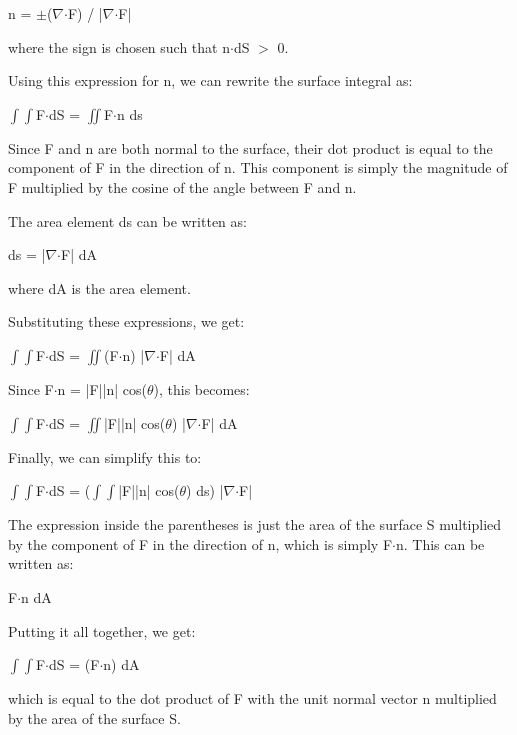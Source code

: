 \documentclass{article}
\begin{document}
n = \ensuremath{\pm}(\ensuremath{\nabla}\ensuremath{\cdot}F) / |\ensuremath{\nabla}\ensuremath{\cdot}F|

where the sign is chosen such that n\ensuremath{\cdot}dS \ensuremath{>} 0.

Using this expression for n, we can rewrite the surface integral as:

\ensuremath{\int}\ensuremath{\int}F\ensuremath{\cdot}dS = \ensuremath{\iint}F\ensuremath{\cdot}n ds

Since F and n are both normal to the surface, their dot product is equal to the component of F in the direction of n. This component is simply the magnitude of F multiplied by the cosine of the angle between F and n.

The area element ds can be written as:

ds = |\ensuremath{\nabla}\ensuremath{\cdot}F| dA

where dA is the area element.

Substituting these expressions, we get:

\ensuremath{\int}\ensuremath{\int}F\ensuremath{\cdot}dS = \ensuremath{\iint}(F\ensuremath{\cdot}n) |\ensuremath{\nabla}\ensuremath{\cdot}F| dA

Since F\ensuremath{\cdot}n = |F||n| cos(\ensuremath{\theta}), this becomes:

\ensuremath{\int}\ensuremath{\int}F\ensuremath{\cdot}dS = \ensuremath{\iint}|F||n| cos(\ensuremath{\theta}) |\ensuremath{\nabla}\ensuremath{\cdot}F| dA

Finally, we can simplify this to:

\ensuremath{\int}\ensuremath{\int}F\ensuremath{\cdot}dS = (\ensuremath{\int}\ensuremath{\int}|F||n| cos(\ensuremath{\theta}) ds) |\ensuremath{\nabla}\ensuremath{\cdot}F|

The expression inside the parentheses is just the area of the surface S multiplied by the component of F in the direction of n, which is simply F\ensuremath{\cdot}n. This can be written as:

F\ensuremath{\cdot}n dA

Putting it all together, we get:

\ensuremath{\int}\ensuremath{\int}F\ensuremath{\cdot}dS = (F\ensuremath{\cdot}n) dA

which is equal to the dot product of F with the unit normal vector n multiplied by the area of the surface S.
                
                \vspace{0.5cm} 
        
\end{document}
